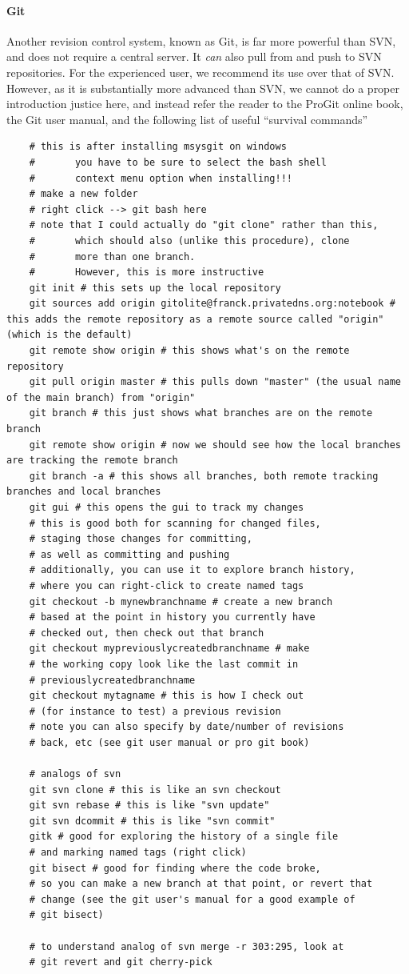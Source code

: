 \paragraph{Git}
Another revision control system,
    known as Git, is far more powerful than SVN, and does not require
    a central server.
It \textit{can} also pull from and push to SVN repositories.
For the experienced user, we recommend its use over that of SVN.
However, as it is substantially more advanced than SVN,
    we cannot do a proper introduction
    justice here,
    and instead refer the reader to the ProGit online book,
    the Git user manual,
    and the following list of useful ``survival commands''
\begin{lstlisting}
    # this is after installing msysgit on windows
    #       you have to be sure to select the bash shell
    #       context menu option when installing!!!
    # make a new folder
    # right click --> git bash here
    # note that I could actually do "git clone" rather than this,
    #       which should also (unlike this procedure), clone
    #       more than one branch.
    #       However, this is more instructive 
    git init # this sets up the local repository
    git sources add origin gitolite@franck.privatedns.org:notebook # this adds the remote repository as a remote source called "origin" (which is the default)
    git remote show origin # this shows what's on the remote repository
    git pull origin master # this pulls down "master" (the usual name of the main branch) from "origin"
    git branch # this just shows what branches are on the remote branch
    git remote show origin # now we should see how the local branches are tracking the remote branch
    git branch -a # this shows all branches, both remote tracking branches and local branches
    git gui # this opens the gui to track my changes
    # this is good both for scanning for changed files,
    # staging those changes for committing,
    # as well as committing and pushing
    # additionally, you can use it to explore branch history,
    # where you can right-click to create named tags
    git checkout -b mynewbranchname # create a new branch
    # based at the point in history you currently have
    # checked out, then check out that branch
    git checkout mypreviouslycreatedbranchname # make
    # the working copy look like the last commit in
    # previouslycreatedbranchname
    git checkout mytagname # this is how I check out
    # (for instance to test) a previous revision
    # note you can also specify by date/number of revisions
    # back, etc (see git user manual or pro git book)

    # analogs of svn
    git svn clone # this is like an svn checkout
    git svn rebase # this is like "svn update"
    git svn dcommit # this is like "svn commit"
    gitk # good for exploring the history of a single file
    # and marking named tags (right click) 
    git bisect # good for finding where the code broke,
    # so you can make a new branch at that point, or revert that
    # change (see the git user's manual for a good example of
    # git bisect)

    # to understand analog of svn merge -r 303:295, look at
    # git revert and git cherry-pick
\end{lstlisting}
